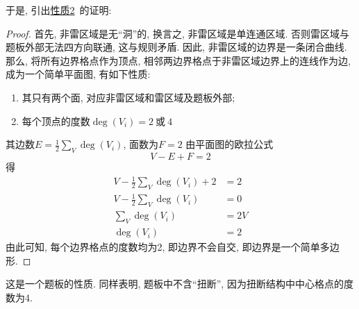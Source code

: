 \documentclass{ctexart}
\newcommand{\varible}[1]{{\Noto[#1]}}
\begin{document}
于是, 引出\hyperref[p2]{性质2}\ 的证明:
\begin{proof}
    \label{proof:SimplePolygon}
    首先, 非雷区域是无``洞''的, 换言之, 非雷区域是单连通区域. 否则雷区域与题板外部无法四方向联通, 这与\varible{O}规则矛盾. 因此, 非雷区域的边界是一条闭合曲线.
    那么, 将所有边界格点作为顶点, 相邻两边界格点于非雷区域边界上的连线作为边, 成为一个简单平面图, 有如下性质:
    \begin{enumerate}
        \item 其只有两个面, 对应非雷区域和雷区域及题板外部;
        \item 每个顶点的度数$\deg(V_i) = 2\ \text{或}\ 4$
    \end{enumerate}
    其边数$\displaystyle E = \frac{1}{2}\sum_{V}\deg(V_i)$, 面数为$F = 2$
    由平面图的欧拉公式
    $$
    V - E + F = 2
    $$
    得
    \begin{align*}
        V - \frac{1}{2}\sum_{V}\deg(V_i) + 2 &= 2 \\
            V - \frac{1}{2}\sum_{V}\deg(V_i) &= 0 \\
                           \sum_{V}\deg(V_i) &= 2V\\
                                   \deg(V_i) &= 2
    \end{align*}
    由此可知, 每个边界格点的度数均为2, 即边界不会自交, 即边界是一个简单多边形.
\end{proof}
这是一个\varible{O}题板的性质. 同样表明, \varible{O}题板中不含``扭断'', 因为扭断结构中中心格点的度数为4.
\end{document}
